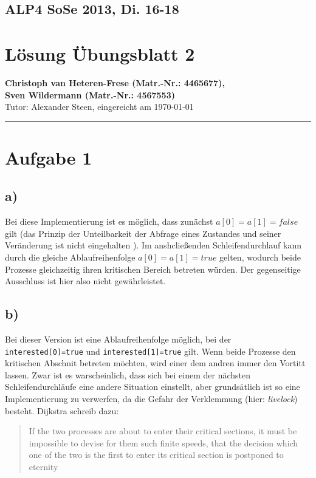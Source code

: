 \documentclass[11pt,a4paper,DIV=10,]{scrartcl}
\begin{document}
\onecolumn
\subsection*{ALP4 SoSe 2013, Di. 16-18}
\section*{Lösung Übungsblatt 2}
\textbf{Christoph van Heteren-Frese (Matr.-Nr.: 4465677), \\ Sven Wildermann (Matr.-Nr.: 4567553)}\\
Tutor: Alexander Steen, eingereicht am \today\\
\hrule

\section*{Aufgabe 1}
\subsection*{a)}
Bei diese Implementierung ist es möglich, dass zunächst $a[0]=a[1]=false$ gilt (das Prinzip der Unteilbarkeit der Abfrage eines Zustandes und seiner Veränderung ist nicht eingehalten \cite[vgl.][S. 39]{Maurer.2012}). Im anshcließenden Schleifendurchlauf kann durch die gleiche Ablaufreihenfolge $a[0]=a[1]=true$ gelten, wodurch beide Prozesse gleichzeitig ihren kritischen Bereich betreten würden. Der gegenseitige Ausschluss ist hier also nicht gewährleistet. 
\subsection*{b)}
Bei dieser Version ist eine Ablaufreihenfolge möglich, bei der \texttt{interested[0]=true} und \texttt{interested[1]=true} gilt. Wenn beide Prozesse den kritischen Abschnit betreten möchten, wird einer dem andren immer den Vortitt lassen. Zwar ist es warscheinlich, dass sich bei einem der nächsten Schleifendurchläufe eine andere Situation einstellt, aber grundsätlich ist so eine Implementierung zu verwerfen, da die Gefahr der Verklemmung (hier: \textit{livelock}) besteht. Dijkstra schreib dazu: \begin{quote}\glqq If the two processes are about to enter their critical sections, it must be impossible to devise for them such finite speeds, that the decision which one of the two is the first to enter its critical section is postponed to eternity\grqq \\ \cite[vgl.][S. 80]{Dijkstra.1965}\end{quote}
\end{document}
